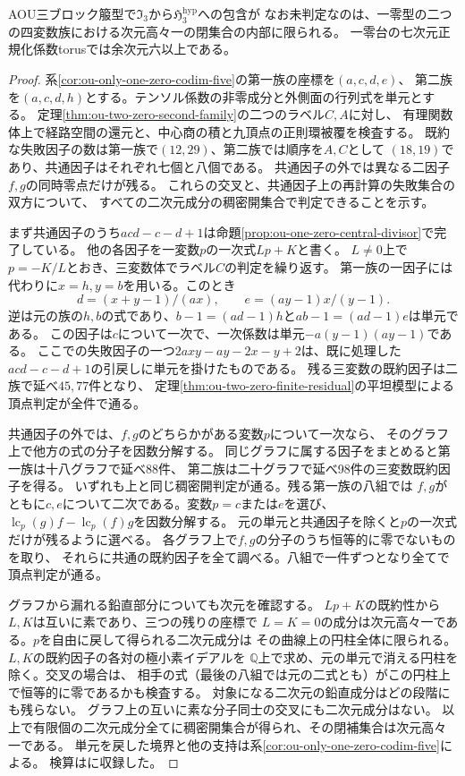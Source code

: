 \begin{theorem}[AOU一零二族に残る曲線と閉点]
\label{thm:ou-one-zero-residual-curves}
AOU三ブロック箙型で$\mathfrak I_3$から$\mathfrak H^{\mathrm{hyp}}_3$への包含が
なお未判定なのは、一零型の二つの四変数族における次元高々一の閉集合の内部に限られる。
一零台の七次元正規化係数torusでは余次元六以上である。
\end{theorem}
\begin{proof}
系\ref{cor:ou-only-one-zero-codim-five}の第一族の座標を$(a,c,d,e)$、
第二族を$(a,c,d,h)$とする。テンソル係数の非零成分と外側面の行列式を単元とする。
定理\ref{thm:ou-two-zero-second-family}の二つのラベル$C,A$に対し、
有理関数体上で経路空間の還元と、中心商の積と九頂点の正則環被覆を検査する。
既約な失敗因子の数は第一族で$(12,29)$、第二族では順序を$A,C$として
$(18,19)$であり、共通因子はそれぞれ七個と八個である。
共通因子の外では異なる二因子$f,g$の同時零点だけが残る。
これらの交叉と、共通因子上の再計算の失敗集合の双方について、
すべての二次元成分の稠密開集合で判定できることを示す。

まず共通因子のうち$acd-c-d+1$は命題\ref{prop:ou-one-zero-central-divisor}で完了している。
他の各因子を一変数$p$の一次式$Lp+K$と書く。
$L\ne0$上で$p=-K/L$とおき、三変数体でラベル$C$の判定を繰り返す。
第一族の一因子には代わりに$x=h,y=b$を用いる。このとき
\[
 d=(x+y-1)/(ax),\qquad e=(ay-1)x/(y-1).
\]
逆は元の族の$h,b$の式であり、$b-1=(ad-1)h$と$ab-1=(ad-1)e$は単元である。
この因子は$c$について一次で、一次係数は単元$-a(y-1)(ay-1)$である。
ここでの失敗因子の一つ$2axy-ay-2x-y+2$は、既に処理した
$acd-c-d+1$の引戻しに単元を掛けたものである。
残る三変数の既約因子は二族で延べ$45,77$件となり、
定理\ref{thm:ou-two-zero-finite-residual}の平坦模型による頂点判定が全件で通る。

共通因子の外では、$f,g$のどちらかがある変数$p$について一次なら、
そのグラフ上で他方の式の分子を因数分解する。
同じグラフに属する因子をまとめると第一族は十八グラフで延べ88件、
第二族は二十グラフで延べ98件の三変数既約因子を得る。
いずれも上と同じ稠密開判定が通る。残る第一族の八組では
$f,g$がともに$c,e$について二次である。変数$p=c$または$e$を選び、
$\operatorname{lc}_p(g)f-\operatorname{lc}_p(f)g$を因数分解する。
元の単元と共通因子を除くと$p$の一次式だけが残るように選べる。
各グラフ上で$f,g$の分子のうち恒等的に零でないものを取り、
それらに共通の既約因子を全て調べる。八組で一件ずつとなり全てで頂点判定が通る。

グラフから漏れる鉛直部分についても次元を確認する。
$Lp+K$の既約性から$L,K$は互いに素であり、三つの残りの座標で
$L=K=0$の成分は次元高々一である。$p$を自由に戻して得られる二次元成分は
その曲線上の円柱全体に限られる。$L,K$の既約因子の各対の極小素イデアルを
$\mathbb Q$上で求め、元の単元で消える円柱を除く。交叉の場合は、
相手の式（最後の八組では元の二式とも）がこの円柱上で恒等的に零であるかも検査する。
対象になる二次元の鉛直成分はどの段階にも残らない。
グラフ上の互いに素な分子同士の交叉にも二次元成分はない。
以上で有限個の二次元成分全てに稠密開集合が得られ、その閉補集合は次元高々一である。
単元を戻した境界と他の支持は系\ref{cor:ou-only-one-zero-codim-five}による。
検算はに収録した。
\end{proof}

